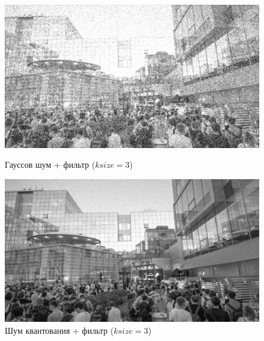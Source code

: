 \documentclass[a4paper]{article}
\begin{document}
\begin{figure}[H]
    \begin{minipage}{0.49\textwidth}
        \centering \includegraphics[width=\textwidth]{images/3_nonlinear_filters/gaussian - 2d-median (ksize=3).jpg}
        \caption{Гауссов шум + фильтр ($ksize = 3$)}
    \end{minipage}\hfill
    \begin{minipage}{0.49\textwidth}
        \centering \includegraphics[width=\textwidth]{images/3_nonlinear_filters/poisson - 2d-median (ksize=3).jpg}
        \caption{Шум квантования + фильтр ($ksize = 3$)}
    \end{minipage}
\end{figure}
\end{document}
